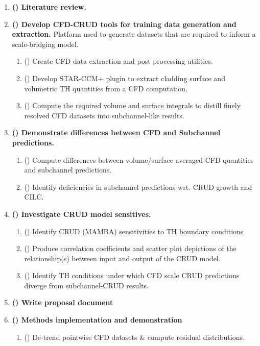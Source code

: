 \begin{enumerate}
\item \textbf{(\checkmark) Literature review.}
\item \textbf{(\checkmark) Develop CFD-CRUD tools for training data generation and extraction.}
          Platform used to generate datasets that are
          required to inform a scale-bridging model.
    \begin{enumerate}
        \item (\checkmark) Create CFD data extraction and post processing utilities.
        \item (\checkmark) Develop STAR-CCM+ plugin to extract cladding surface and volumetric TH quantities from a CFD computation.
        \item (\checkmark) Compute the required volume and surface integrals to
              distill finely resolved CFD datasets into subchannel-like results.
    \end{enumerate}
\item \textbf{(\checkmark) Demonstrate differences between CFD and Subchannel predictions.}
    \begin{enumerate}
        \item (\checkmark) Compute differences between volume/surface averaged CFD quantities and subchannel predictions.
        \item (\checkmark) Identify deficiencies in subchannel predictions wrt. CRUD growth and CILC.
    \end{enumerate}
\item \textbf{(\checkmark) Investigate CRUD model sensitives.}
    \begin{enumerate}
        \item (\checkmark) Identify CRUD (MAMBA) sensitivities to TH boundary conditions
        \item (\checkmark) Produce correlation coefficients and scatter plot depictions of the relationship(s) between input
              and output of the CRUD model.
          \item (\checkmark) Identify TH conditions under which CFD scale CRUD predictions diverge from subchannel-CRUD results.
    \end{enumerate}
\item \textbf{(\checkmark) Write proposal document}
%
\item \textbf{(\checkmark) Methods implementation and demonstration}
    \begin{enumerate}
        \item (\checkmark) De-trend pointwise CFD datasets \& compute residual distributions.

\end{enumerate}
\end{enumerate}
